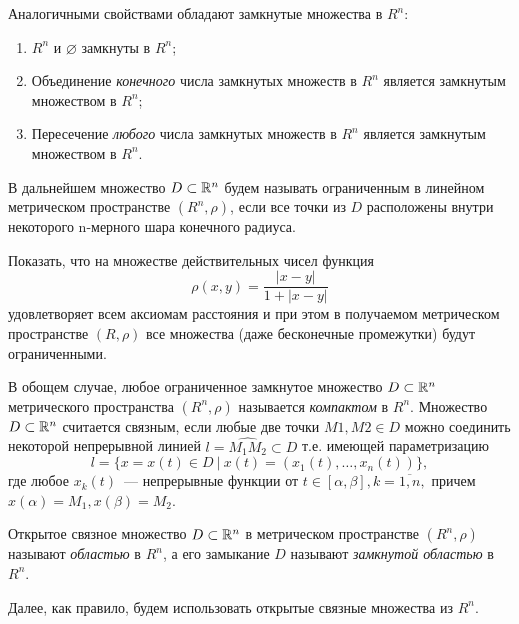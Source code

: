 \documentclass[../../main.tex]{subfiles}
\begin{document}
  Аналогичными свойствами обладают замкнутые множества в $R^n$:
  \begin{enumerate}
    \item  $R^n$  и $\varnothing$ замкнуты в $R^n$;
    \item Объединение \emph{конечного}  числа замкнутых множеств в 
    $R^n$ является замкнутым множеством в $R^n$; 
    \item Пересечение \emph{любого} числа замкнутых множеств в $R^n$ 
    является замкнутым множеством в $R^n$.
  \end{enumerate} 
  
  
  В дальнейшем множество $D \subset \mathbb{R}^n$ будем называть 
  ограниченным в линейном метрическом пространстве $ (R^n, \rho) $, 
  если все точки из $D$ расположены внутри некоторого n-мерного шара 
  конечного радиуса.
  
  \begin{exc}
    Показать, что на множестве действительных чисел функция 
    \[ 
      \rho(x, y) = \frac{|x - y|}{1 + |x - y|}
    \] удовлетворяет всем аксиомам расстояния и при этом в 
    получаемом метрическом пространстве $ (R, \rho) $ все множества 
    (даже бесконечные промежутки) будут ограниченными.   
   \end{exc} 
 
  \smallskip   
  В обощем случае, любое ограниченное замкнутое множество $D \subset 
  \mathbb{R}^n$ метрического пространства $ (R^n, \rho) $ называется 
  \emph{компактом} в $R^n$.
  Множество $D \subset \mathbb{R}^n$ считается связным, если любые две точки 
  $M1,M2 \in D $ можно соединить некоторой непрерывной линией $ l = 
  \widehat{M_1M_2} \subset D$  
  т.е. имеющей параметризацию
  \[
    l = \{x = x(t) \in D\ |\ x(t) = (x_1(t), \dots, x_n(t))\},
  \]
  где любое $x_k(t)$~--- непрерывные функции от $t \in [\alpha, 
  \beta], k = \overline{1,n},$ причем $ x(\alpha) = M_1, x(\beta) = 
  M_2.$
   
  Открытое связное множество $D \subset \mathbb{R}^n$ в метрическом 
  пространстве $ (R^n, \rho) $ называют \emph{областью} в $R^n$, а 
  его замыкание $D$ называют \emph{замкнутой областью} в $R^n$.
   
  Далее, как правило, будем использовать открытые связные множества 
  из $R^n$.
  
\end{document}
